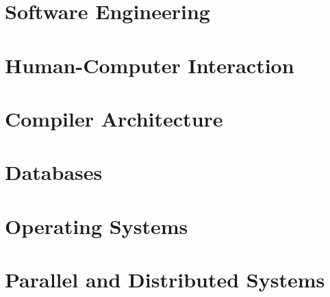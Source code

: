 \documentclass[11pt,twoside=semi,openright,numbers=noenddot,titlepage=false]{scrbook}
\begin{document}
\part{Software Engineering}\label{part:engineering}
\parttoc{}
% 
% 
% 
% 
% 
% 
% 


\part{Human-Computer Interaction}\label{part:hci}
\parttoc{}
% 
% 
% 


\part{Compiler Architecture}\label{part:compilers}
\parttoc{}
% 
% 
% 
% 
% 
% 
% 


\part{Databases}\label{part:db}
\parttoc{}
% 
% 
% 
% 
% 


\part{Operating Systems}\label{part:os}
\parttoc{}
% 
% 
% 
% 
% 
% 


\part{Parallel and Distributed Systems}\label{part:distributed}
\parttoc{}
% 
% 
% 
% 
% 
% 
\end{document}

